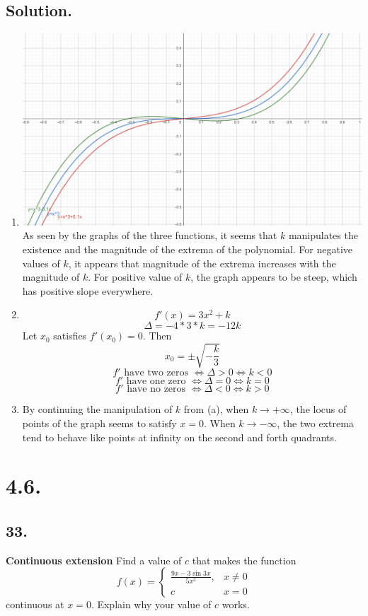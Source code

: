 \documentclass{article}
\begin{document}
\subsection*{Solution.}
\begin{enumerate}[label=\textbf{\alph*.}]
    \item \text{   }\newline
    \includegraphics[scale=0.25]{img/圖片_2021-12-12_002741.png}\newline
    As seen by the graphs of the three functions, it seems that $k$ manipulates the existence and the magnitude of the extrema of the polynomial.\newline
    For negative values of $k$, it appears that magnitude of the extrema increases with the magnitude of $k$.
    For positive value of $k$, the graph appears to be steep, which has positive slope everywhere.
    \item \[f'(x)=3x^2+k\]
    \[\Delta=-4*3*k=-12k\]
    Let $x_0$ satisfies $f'(x_0)=0$.
    Then
    \[x_0=\pm\sqrt{-\frac{k}{3}}\]
    \[f' \text{  have two zeros  }\Leftrightarrow \Delta>0\Leftrightarrow k<0\]
    \[f' \text{  have one zero  }\Leftrightarrow \Delta=0\Leftrightarrow k=0\]
    \[f' \text{  have no zeros  }\Leftrightarrow \Delta<0\Leftrightarrow k>0\]
    \item By continuing the manipulation of $k$ from (a), when $k\to+\infty$, the locus of points of the graph seems to satisfy $x=0$.\newline
    When $k\to -\infty$, the two extrema tend to behave like points at infinity on the second and forth quadrants.
\end{enumerate}
\section*{4.6.}
\subsection*{33.}
\textbf{Continuous extension}   Find a value of $c$ that makes the function
\[f(x)=\left\{\begin{array}{ll}
\frac{9x-3\sin{3x}}{5x^3}, & x\neq 0 \\
c & x=0
\end{array}\right.\]
continuous at $x=0$. Explain why your value of $c$ works.
\end{document}
